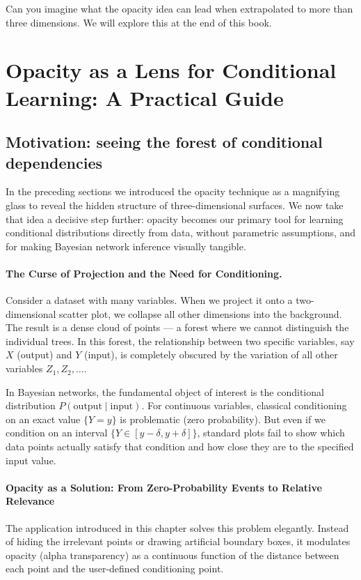 Can you imagine what the opacity idea can lead when extrapolated to more than three dimensions. We will explore this at the end of this book.

\section{Opacity as a Lens for Conditional Learning: A Practical Guide}

\subsection{Motivation: seeing the forest of conditional dependencies}

In the preceding sections we introduced the opacity technique as a magnifying glass to reveal the hidden structure of three-dimensional surfaces. We now take that idea a decisive step further: opacity becomes our primary tool for learning conditional distributions directly from data, without parametric assumptions, and for making Bayesian network inference visually tangible.

\paragraph{The Curse of Projection and the Need for Conditioning.}
Consider a dataset with many variables. When we project it onto a two-dimensional scatter plot, we collapse all other dimensions into the background. The result is a dense cloud of points — a forest where we cannot distinguish the individual trees. In this forest, the relationship between two specific variables, say \(X\) (output) and \(Y\) (input), is completely obscured by the variation of all other variables \(Z_1,Z_2,\dots\).

In Bayesian networks, the fundamental object of interest is the conditional distribution \(P(\text{output} \mid \text{input})\). For continuous variables, classical conditioning on an exact value \(\{Y = y\}\) is problematic (zero probability). But even if we condition on an interval \(\{Y \in [y-\delta, y+\delta]\}\), standard plots fail to show which data points actually satisfy that condition and how close they are to the specified input value.

\paragraph{Opacity as a Solution: From Zero-Probability Events to Relative Relevance}
The application introduced in this chapter solves this problem elegantly. Instead of hiding the irrelevant points or drawing artificial boundary boxes, it modulates opacity (alpha transparency) as a continuous function of the distance between each point and the user-defined conditioning point.


